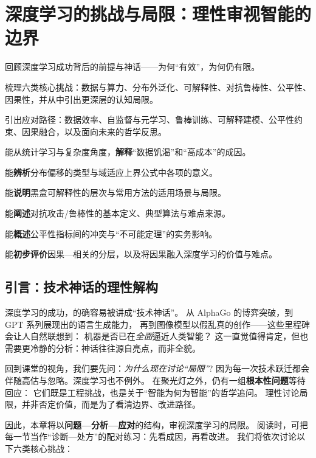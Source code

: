 \chapter{深度学习的挑战与局限：理性审视智能的边界}

\begin{introduction}[本章提要]
  \item 回顾深度学习成功背后的前提与神话——为何“有效”，为何仍有限。
  \item 梳理六类核心挑战：数据与算力、分布外泛化、可解释性、对抗鲁棒性、公平性、因果性，并从中引出更深层的认知局限。
  \item 引出应对路径：数据效率、自监督与元学习、鲁棒训练、可解释建模、公平性约束、因果融合，以及面向未来的哲学反思。
\end{introduction}

\begin{introduction}[你将收获]
  \item 能从统计学习与复杂度角度，\textbf{解释}“数据饥渴”和“高成本”的成因。
  \item 能\textbf{辨析}分布偏移的类型与域适应上界公式中各项的意义。
  \item 能\textbf{说明}黑盒可解释性的层次与常用方法的适用场景与局限。
  \item 能\textbf{阐述}对抗攻击/鲁棒性的基本定义、典型算法与难点来源。
  \item 能\textbf{概述}公平性指标间的冲突与“不可能定理”的实务影响。
  \item 能\textbf{初步评价}因果—相关的分层，以及将因果融入深度学习的价值与难点。
\end{introduction}

\section{引言：技术神话的理性解构}

深度学习的成功，的确容易被讲成“技术神话”。  
从 AlphaGo 的博弈突破，到 GPT 系列展现出的语言生成能力，  
再到图像模型以假乱真的创作——这些里程碑会让人自然联想到：  
机器是否已在\textit{全面}逼近人类智能？  
这一直觉值得肯定，但也需要更冷静的分析：神话往往源自亮点，而非全貌。

回到课堂的视角，我们要先问：\textit{为什么现在讨论“局限”}?  
因为每一次技术跃迁都会伴随高估与忽略。深度学习也不例外。  
在聚光灯之外，仍有一组\textbf{根本性问题}等待回应：  
它们既是工程挑战，也是关于“智能为何为智能”的哲学追问。  
理性讨论局限，并非否定价值，而是为了看清边界、改进路径。

因此，本章将以\textbf{问题—分析—应对}的结构，审视深度学习的局限。  
阅读时，可把每一节当作“诊断—处方”的配对练习：先看成因，再看改进。  
我们将依次讨论以下六类核心挑战：

